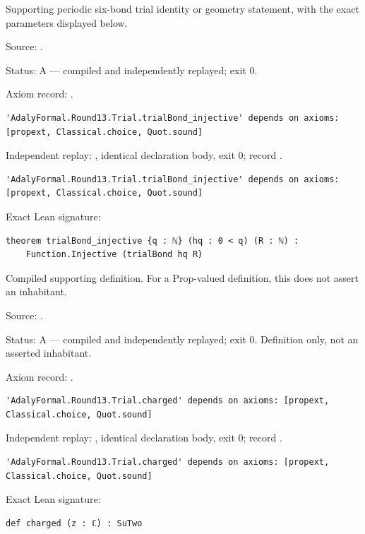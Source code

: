 \begin{theorem}[bp-352]
\label{bp-352}
\leanok
Supporting periodic six-bond trial identity or geometry statement, with the exact parameters displayed below.

\par Source: \texttt{}.
\par Status: A — compiled and independently replayed; exit 0.
\par Axiom record: \texttt{}.
\begin{verbatim}
'AdalyFormal.Round13.Trial.trialBond_injective' depends on axioms: [propext, Classical.choice, Quot.sound]
\end{verbatim}
\par Independent replay: \texttt{}, identical declaration body, exit 0; record \texttt{}.
\begin{verbatim}
'AdalyFormal.Round13.Trial.trialBond_injective' depends on axioms: [propext, Classical.choice, Quot.sound]
\end{verbatim}
\par Exact Lean signature:
\begin{verbatim}
theorem trialBond_injective {q : ℕ} (hq : 0 < q) (R : ℕ) :
    Function.Injective (trialBond hq R)
\end{verbatim}
\end{theorem}

\begin{definition}[bp-353]
\label{bp-353}
\uses{}
\leanok
Compiled supporting definition. For a Prop-valued definition, this does not assert an inhabitant.

\par Source: \texttt{}.
\par Status: A — compiled and independently replayed; exit 0. Definition only, not an asserted inhabitant.
\par Axiom record: \texttt{}.
\begin{verbatim}
'AdalyFormal.Round13.Trial.charged' depends on axioms: [propext, Classical.choice, Quot.sound]
\end{verbatim}
\par Independent replay: \texttt{}, identical declaration body, exit 0; record \texttt{}.
\begin{verbatim}
'AdalyFormal.Round13.Trial.charged' depends on axioms: [propext, Classical.choice, Quot.sound]
\end{verbatim}
\par Exact Lean signature:
\begin{verbatim}
def charged (z : ℂ) : SuTwo
\end{verbatim}
\end{definition}

